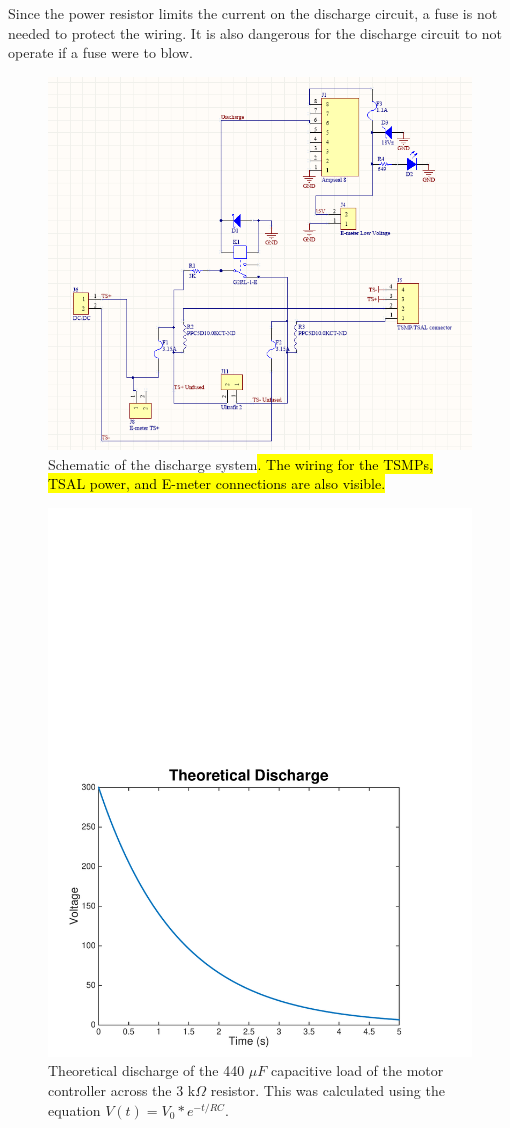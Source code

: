 \documentclass{article}
\DeclareRobustCommand{\hlr}[1]{{\sethlcolor{pink}\hl{#1}}}
\begin{document}
Since the power resistor limits the current on the discharge circuit, a fuse is not needed to protect the wiring. It is also dangerous for the discharge circuit to not operate if a fuse were to blow. 

\begin{figure}[H]
    \centering
    \includegraphics[width = 0.7 \textwidth]{Discharge.png}
    \caption{Schematic of the discharge system\hlr{. The wiring for the TSMPs, TSAL power, and E-meter connections are also visible.}}
    \label{discharge_schem}
\end{figure}

\begin{figure}[H]
    \centering
    \includegraphics[width = 0.7 \textwidth]{discharge_voltage}
    \caption{Theoretical discharge of the 440 $\mu F$ capacitive load of the motor controller across the 3 k$\Omega$ resistor. This was calculated using the equation $V(t) = V_{0} * e^{-t/RC}$.}
    \label{fig:discharge_voltage}
\end{figure}
\end{document}
